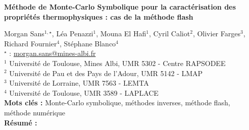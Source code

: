 


    \newpage


%
\begin{flushleft}
\addtocounter{section}{1}
{\Large \textbf{Méthode de Monte-Carlo Symbolique pour la caractérisation des propriétés thermophysiques : cas de la méthode flash}}\label{ref:76}
\end{flushleft}
%
Morgan Sans$^{1,\star}$, Léa Penazzi$^{1}$, Mouna El Hafi$^{1}$, Cyril Caliot$^{2}$, Olivier Farges$^{3}$, Richard Fournier$^{4}$, Stéphane Blanco$^{4}$\\[2mm]
$^{\star}$ \Letter : \url{morgan.sans@mines-albi.fr}\\[2mm]
{\footnotesize $^{1}$ Université de Toulouse, Mines Albi, UMR 5302 - Centre RAPSODEE}\\
{\footnotesize $^{2}$ Université de Pau et des Pays de l'Adour, UMR 5142 - LMAP}\\
{\footnotesize $^{3}$ Université de Lorraine, UMR 7563 - LEMTA}\\
{\footnotesize $^{4}$ Université de Toulouse, UMR 3589 - LAPLACE}\\
[4mm]
%
\noindent \textbf{Mots clés : } Monte-Carlo symbolique, méthodes inverses, méthode flash, méthode numérique\\[4mm]
%
\noindent \textbf{Résumé : } 


